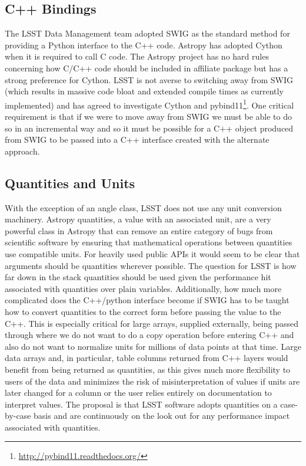 \documentclass[]{spie}  %
\begin{document}
\subsection{C++ Bindings}

The LSST Data Management team adopted SWIG as the standard method for providing a Python interface to the C++ code.
Astropy has adopted Cython\cite{2010/content/aip/journal/cise/13/2/10.1109/MCSE.2010.118} when it is required to call C code.
The Astropy project has no hard rules concerning how C/C++ code should be included in affiliate package but has a strong preference for Cython.
LSST is not averse to switching away from SWIG (which results in massive code bloat and extended compile times as currently implemented) and has agreed to investigate Cython\cite{dmtn-013} and pybind11\cite{dmtn-014}\footnote{\url{http://pybind11.readthedocs.org/}}.
One critical requirement is that if we were to move away from SWIG we must be able to do so in an incremental way and so it must be possible for a C++ object produced from SWIG to be passed into a C++ interface created with the alternate approach.

\subsection{Quantities and Units}

With the exception of an angle class, LSST does not use any unit conversion machinery.
Astropy quantities, a value with an associated unit, are a very powerful class in Astropy that can remove an entire category of bugs from scientific software by ensuring that mathematical operations between quantities use compatible units.
For heavily used public APIs it would seem to be clear that arguments should be quantities wherever possible.
The question for LSST is how far down in the stack quantities should be used given the performance hit associated with quantities over plain variables.
Additionally, how much more complicated does the C++/python interface become if SWIG has to be taught how to convert quantities to the correct form before passing the value to the C++.
This is especially critical for large arrays, supplied externally, being passed through where we do not want to do a copy operation before entering C++ and also do not want to normalize units for millions of data points at that time.
Large data arrays and, in particular, table columns returned from C++ layers would benefit from being returned as quantities, as this gives much more flexibility to users of the data and minimizes the risk of misinterpretation of values if units are later changed for a column or the user relies entirely on documentation to interpret values.
The proposal is that LSST software adopts quantities on a case-by-case basis and are continuously on the look out for  any performance impact associated with quantities.
\end{document}
